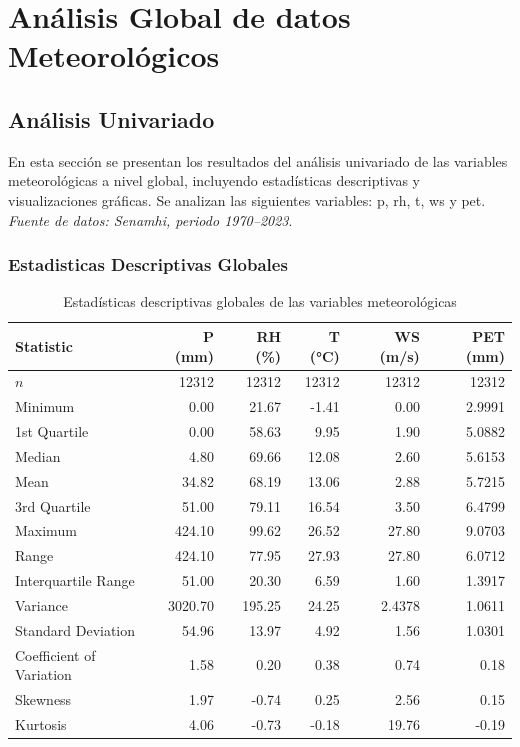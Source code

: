 \chapter{Análisis Global de datos Meteorológicos}
\section{Análisis Univariado}

En esta sección se presentan los resultados del análisis univariado de las variables meteorológicas a nivel global, incluyendo estadísticas descriptivas y visualizaciones gráficas. Se analizan las siguientes variables: \gls{p}, \gls{rh}, \gls{t}, \gls{ws} y \gls{pet}. \textit{Fuente de datos: Senamhi, periodo 1970--2023}.



\subsection{Estadisticas Descriptivas Globales}

\begin{table}[htbp]
\centering
\caption{Estadísticas descriptivas globales de las variables meteorológicas}
\label{tab:global_statistics}
\scriptsize
\begin{tabular}{lrrrrr}
\toprule
\textbf{Statistic} & \textbf{P (mm)} & \textbf{RH (\%)} & \textbf{T (°C)} & \textbf{WS (m/s)} & \textbf{PET (mm)} \\
\midrule
$n$                         & 12312 & 12312 & 12312 & 12312 & 12312 \\
Minimum                    & 0.00   & 21.67  & -1.41  & 0.00   & 2.9991 \\
1st Quartile               & 0.00   & 58.63  & 9.95   & 1.90   & 5.0882 \\
Median                     & 4.80   & 69.66  & 12.08  & 2.60   & 5.6153 \\
Mean                       & 34.82  & 68.19  & 13.06  & 2.88   & 5.7215 \\
3rd Quartile               & 51.00  & 79.11  & 16.54  & 3.50   & 6.4799 \\
Maximum                    & 424.10 & 99.62  & 26.52  & 27.80  & 9.0703 \\
Range                      & 424.10 & 77.95  & 27.93  & 27.80  & 6.0712 \\
Interquartile Range        & 51.00  & 20.30  & 6.59   & 1.60   & 1.3917 \\
Variance                   & 3020.70 & 195.25 & 24.25  & 2.4378 & 1.0611 \\
Standard Deviation         & 54.96  & 13.97  & 4.92   & 1.56   & 1.0301 \\
Coefficient of Variation   & 1.58   & 0.20   & 0.38   & 0.74   & 0.18 \\
Skewness                 & 1.97   & -0.74  & 0.25   & 2.56   & 0.15 \\
Kurtosis                   & 4.06   & -0.73  & -0.18  & 19.76  & -0.19 \\
\bottomrule
\end{tabular}
\end{table}


